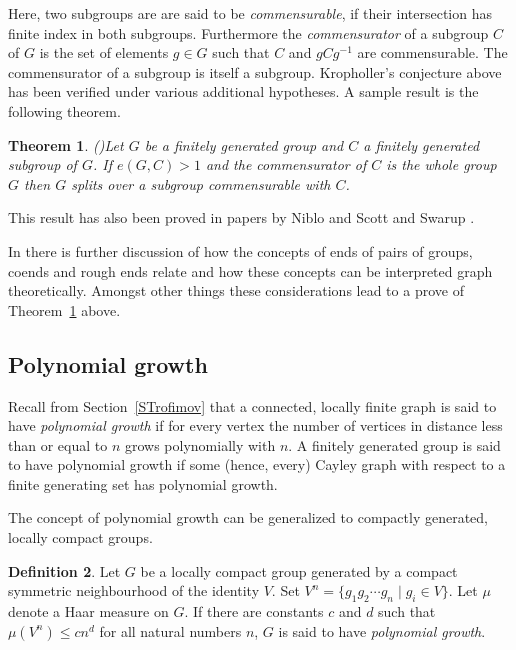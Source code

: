 \documentclass{emsprocart}
\newtheorem{theorem}{Theorem}[section]
\theoremstyle{definition}
\newtheorem{definition}[theorem]{Definition}
\begin{document}
Here, two subgroups are are said to be \emph{commensurable},
if their intersection has finite index in both subgroups. Furthermore the
\emph{commensurator} of a subgroup $C$ of $G$ is the set
of elements $g\in G$ such that $C$ and $gCg^{-1}$ are commensurable.
The commensurator of a subgroup is itself a subgroup.
Kropholler's conjecture above has been verified under various
additional hypotheses.  A sample result is the following theorem.

\begin{theorem}{\rm (\cite[p.~30]{DunwoodyRoller1993})}\label{Tcommensurator}
 Let $G$ be a finitely generated group and $C$ a finitely generated
  subgroup of $G$.  If $e(G, C)>1$  and
the commensurator of $C$ is the whole group $G$ then $G$
  splits over a subgroup commensurable with $C$.
\end{theorem}
This result has also been proved in papers
by Niblo \cite[cf. Theorem~B]{Niblo2002} and Scott and Swarup
\cite[Theorem~3.12]{ScottSwarup2000}.

In \cite[Section~3.7]{KronMoller2008} there is further discussion of how
the concepts of ends of pairs of groups, coends and rough ends relate
and how these concepts can be interpreted graph theoretically.
Amongst other things these considerations lead to a prove of
Theorem~\ref{Tcommensurator} above.

\subsection{Polynomial growth}\label{SPolynomial}
Recall from Section~\ref{STrofimov} that
a connected, locally finite graph is said to have {\em polynomial
  growth} if for every vertex the number of vertices in distance less
  than or equal to $n$ grows polynomially with $n$.  A finitely
  generated group is said to have polynomial growth if some (hence,
  every) Cayley graph with respect to a finite generating set has
  polynomial growth.

The concept of polynomial growth can be generalized to compactly
generated, locally compact groups.

\begin{definition}\label{DTopoPolynomial}
Let $G$ be a locally compact group generated by a compact
symmetric neighbourhood of the identity $V$.  Set
$V^n=\{g_1 g_2\cdots g_n\mid g_i\in V\}$.
Let $\mu$ denote a Haar measure on
$G$.  If there are constants $c$ and $d$ such that $\mu(V^n)\leq cn^d$
for all natural numbers $n$, $G$ is said to have {\em polynomial growth}.
\end{definition}
\end{document}
